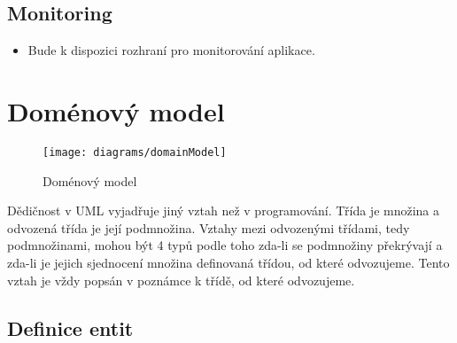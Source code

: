 \subsection{Monitoring}\label{subsec:monitoring}

\begin{itemize}
\item
  Bude k dispozici rozhraní pro monitorování aplikace.
\end{itemize}

\section{Doménový model}\label{sec:domenovy-model}

\begin{figure}[H]
    \texttt{[image: diagrams/domainModel]}
    \caption{Doménový model}\label{fig:figure}
\end{figure}

\begin{tcolorbox}
Dědičnost v UML vyjadřuje jiný vztah než v programování.
Třída je množina a odvozená třída je její podmnožina.
Vztahy mezi odvozenými třídami, tedy podmnožinami, mohou být 4 typů podle toho zda-li se podmnožiny překrývají a zda-li je jejich sjednocení množina definovaná třídou, od které odvozujeme.
Tento vztah je vždy popsán v poznámce k třídě, od které odvozujeme.
\end{tcolorbox}

\subsection{Definice entit}\label{subsec:definiceentit}


